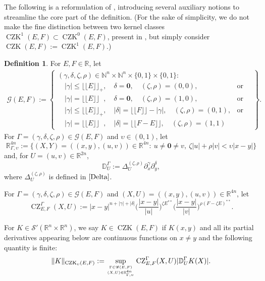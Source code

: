 \documentclass[11pt, reqno]{amsart}
\theoremstyle{definition}
\newtheorem{definition}[theorem]{Definition}
\theoremstyle{remark}
\numberwithin{equation}{section}
\newcommand{\N}{\mathbb N}
\newcommand{\R}{\mathbb R}
\newcommand{\Floor}[1]{\lfloor\!\lfloor #1 \rfloor\!\rfloor}
\newcommand{\abs}[1]{|#1|}
\newcommand{\Norm}[2]{\|#1\|_{#2}}
\begin{document}
The following is a reformulation of \cite[Definition 6.11]{BHYY:1c}, introducing several auxiliary notions to streamline the core part of the definition.
(For the sake of simplicity, we do not make the fine distinction between two kernel classes $\operatorname{CZK}^1(E,F)\subset\operatorname{CZK}^0(E,F)$, present in \cite{BHYY:1c}, but simply consider $\operatorname{CZK}(E,F):=\operatorname{CZK}^1(E,F)$.)

\begin{definition}\label{def:CZK1}
For $E,F\in\R$, let
\begin{equation}\label{eq:GEF}
\begin{split}
  \mathscr G(E,F):=
  \left.\begin{cases}
    (\gamma,\delta,\zeta,\rho)\in\N^n\times\N^n\times\{0,1\}\times\{0,1\}: \\
    \quad\abs{\gamma}\leq\Floor{E}_+,\quad\delta=\mathbf 0,\quad(\zeta,\rho)=(0,0), & \text{or}\quad \\
    \quad\abs{\gamma}=\Floor{E}\phantom{_+},\quad\delta=\mathbf 0,\quad(\zeta,\rho)=(1,0), & \text{or} \\
    \quad\abs{\gamma}\leq\Floor{E}_+,\quad\abs{\delta}=\Floor{F}-\abs{\gamma},\quad(\zeta,\rho)=(0,1), & \text{or} \\
    \quad\abs{\gamma}=\Floor{E}\phantom{_+},\quad\abs{\delta}=\Floor{F-E},\quad(\zeta,\rho)=(1,1)
    \end{cases}\right\}.
\end{split}
\end{equation}
For $\Gamma=(\gamma,\delta,\zeta,\rho)\in\mathscr G(E,F)$ and $\upsilon\in(0,1)$, let
\begin{equation*}
  \R^{4n}_{\Gamma,\upsilon}:=
  \Big\{(X,Y)=((x,y),(u,v))\in\R^{4n}:\ u\neq\mathbf 0\neq v,\ \zeta\abs{u}+\rho\abs{v}<\upsilon\abs{x-y}\Big\}
\end{equation*}
and, for $U=(u,v)\in\R^{2n}$,
\begin{equation*}
  \mathbb D_{U}^\Gamma:=\Delta_{U}^{(\zeta,\rho)}\partial_x^\gamma\partial_y^\delta,
\end{equation*}
where $\Delta_{U}^{(\zeta,\rho)}$ is defined in $\eqref{Delta}$.

For $\Gamma=(\gamma,\delta,\zeta,\rho)\in\mathscr G(E,F)$ and $(X,U)=((x,y),(u,v))\in\R^{4n}$, let
\begin{equation*}
  \operatorname{CZ}_{E,F}^{\Gamma}(X,U)
  :=\abs{x-y}^{n+\abs{\gamma}+\abs{\delta}}\bigg(\frac{\abs{x-y}}{\abs{u}}\bigg)^{\zeta E^{**}}
  \bigg(\frac{\abs{x-y}}{\abs{v}}\bigg)^{\rho(F-\zeta E)^{**}}.
\end{equation*}

For $K\in\mathscr S'(\R^n\times\R^n)$, we say $K\in\operatorname{CZK}(E,F)$ if $K(x,y)$ and all its partial derivatives appearing below are continuous functions on $x\neq y$ and the following quantity is finite:
\begin{equation*}
  \Norm{K}{\operatorname{CZK}_\upsilon(E,F)}
  :=\sup_{\genfrac{}{}{0pt}{}{\Gamma\in\mathscr G(E,F)}{(X,U)\in\R^{4n}_{\Gamma,\upsilon}}}
  \operatorname{CZ}_{E,F}^{\Gamma}(X,U)\abs{\mathbb D_U^\Gamma K(X)}.
\end{equation*}
\end{definition}
\end{document}
